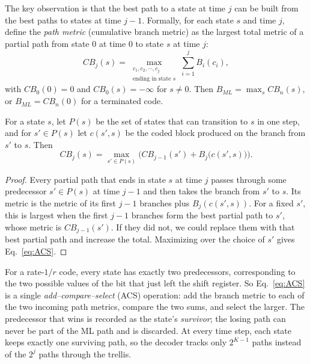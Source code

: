 The key observation is that the best path to a state at time \(j\) can be built from the best paths to states at time \(j-1\). Formally, for each state \(s\) and time \(j\), define the \emph{path metric} (cumulative branch metric) as the largest total metric of a partial path from state \(0\) at time \(0\) to state \(s\) at time \(j\):
\begin{equation*}
    CB_{j}(s) = \max_{\substack{c_1, c_2, \cdots, c_j \\ \text{ending in state } s}} \sum_{i=1}^{j} B_i(c_i),
\end{equation*}
with \(CB_0(0) = 0\) and \(CB_0(s) = -\infty\) for \(s \neq 0\). Then \(B_{ML} = \max_s CB_{n}(s)\), or \(B_{ML} = CB_n(0)\) for a terminated code.

\begin{theorem}\label{thm:dp}
For a state \(s\), let \(P(s)\) be the set of states that can transition to \(s\) in one step, and for \(s' \in P(s)\) let \(c(s',s)\) be the coded block produced on the branch from \(s'\) to \(s\). Then
\begin{equation}
    CB_j(s) = \max_{s' \in P(s)} \Big(CB_{j-1}(s') + B_j\big(c(s',s)\big)\Big). \label{eq:ACS}
\end{equation}
\end{theorem}
\begin{proof}
Every partial path that ends in state \(s\) at time \(j\) passes through some predecessor \(s' \in P(s)\) at time \(j-1\) and then takes the branch from \(s'\) to \(s\). Its metric is the metric of its first \(j-1\) branches plus \(B_j(c(s',s))\). For a fixed \(s'\), this is largest when the first \(j-1\) branches form the best partial path to \(s'\), whose metric is \(CB_{j-1}(s')\). If they did not, we could replace them with that best partial path and increase the total. Maximizing over the choice of \(s'\) gives Eq.~\ref{eq:ACS}.
\end{proof}

For a rate-\(1/r\) code, every state has exactly two predecessors, corresponding to the two possible values of the bit that just left the shift register. So Eq.~\ref{eq:ACS} is a single \emph{add--compare--select} (ACS) operation: add the branch metric to each of the two incoming path metrics, compare the two sums, and select the larger. The predecessor that wins is recorded as the state's \emph{survivor}; the losing path can never be part of the ML path and is discarded. At every time step, each state keeps exactly one surviving path, so the decoder tracks only \(2^{K-1}\) paths instead of the \(2^j\) paths through the trellis.

